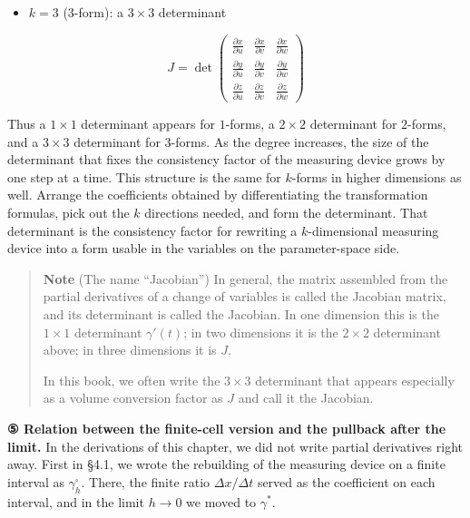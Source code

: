 \documentclass[a4paper,12pt,openany]{book}
\providecommand{\tightlist}{%
  \setlength{\itemsep}{0pt}\setlength{\parskip}{0pt}}
\begin{document}
\begin{itemize}
\tightlist
\item
  \(k=3\) (\(3\)-form): a \(3 \times 3\) determinant
\end{itemize}

\[
J
=
\det
\begin{pmatrix}
\frac{\partial x}{\partial u} & \frac{\partial x}{\partial v} & \frac{\partial x}{\partial w}\\[4pt]
\frac{\partial y}{\partial u} & \frac{\partial y}{\partial v} & \frac{\partial y}{\partial w}\\[4pt]
\frac{\partial z}{\partial u} & \frac{\partial z}{\partial v} & \frac{\partial z}{\partial w}
\end{pmatrix}
\]

Thus a \(1 \times 1\) determinant appears for \(1\)-forms, a
\(2 \times 2\) determinant for \(2\)-forms, and a \(3 \times 3\)
determinant for \(3\)-forms. As the degree increases, the size of the
determinant that fixes the consistency factor of the measuring device
grows by one step at a time. This structure is the same for \(k\)-forms
in higher dimensions as well. Arrange the coefficients obtained by
differentiating the transformation formulas, pick out the \(k\)
directions needed, and form the determinant. That determinant is the
consistency factor for rewriting a \(k\)-dimensional measuring device
into a form usable in the variables on the parameter-space side.

\begin{quote}
\textbf{Note} (The name ``Jacobian'') In general, the matrix assembled
from the partial derivatives of a change of variables is called the
Jacobian matrix, and its determinant is called the Jacobian. In one
dimension this is the \(1\times1\) determinant \(\gamma'(t)\); in two
dimensions it is the \(2\times2\) determinant above; in three dimensions
it is \(J\).

In this book, we often write the \(3\times3\) determinant that appears
especially as a volume conversion factor as \(J\) and call it the
Jacobian.
\end{quote}

\textbf{⑤ Relation between the finite-cell version and the pullback after the limit.}
In the derivations of this chapter, we did not write partial derivatives
right away. First in §4.1, we wrote the rebuilding of the measuring
device on a finite interval as \(\gamma_h^\square\). There, the finite
ratio \(\Delta x/\Delta t\) served as the coefficient on each interval,
and in the limit \(h\to0\) we moved to \(\gamma^*\).
\end{document}
